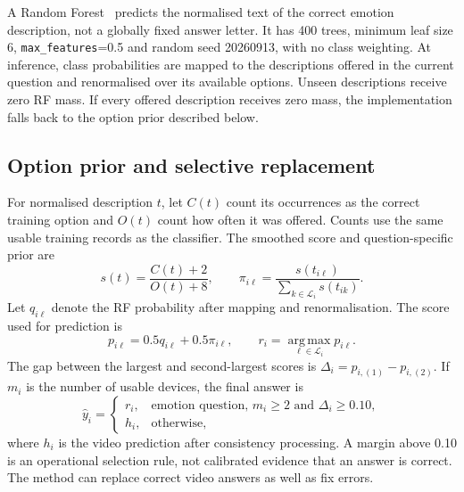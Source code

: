 \documentclass[12pt,a4paper]{article}
\begin{document}
A Random Forest~\cite{breiman} predicts the normalised text of the correct emotion description, not a globally fixed answer letter. It has 400 trees, minimum leaf size 6, \texttt{max\_features}=0.5 and random seed 20260913, with no class weighting. At inference, class probabilities are mapped to the descriptions offered in the current question and renormalised over its available options. Unseen descriptions receive zero RF mass. If every offered description receives zero mass, the implementation falls back to the option prior described below.

\subsection{Option prior and selective replacement}
For normalised description $t$, let $C(t)$ count its occurrences as the correct training option and $O(t)$ count how often it was offered. Counts use the same usable training records as the classifier. The smoothed score and question-specific prior are
\begin{equation}
 s(t)=\frac{C(t)+2}{O(t)+8},\qquad
 \pi_{i\ell}=\frac{s(t_{i\ell})}{\sum_{k\in\mathcal{L}_i}s(t_{ik})}.
\end{equation}
Let $q_{i\ell}$ denote the RF probability after mapping and renormalisation. The score used for prediction is
\begin{equation}
 p_{i\ell}=0.5q_{i\ell}+0.5\pi_{i\ell},\qquad
 r_i=\operatorname*{arg\,max}_{\ell\in\mathcal{L}_i}p_{i\ell}.
\end{equation}
The gap between the largest and second-largest scores is $\Delta_i=p_{i,(1)}-p_{i,(2)}$. If $m_i$ is the number of usable devices, the final answer is
\begin{equation}
 \hat y_i=\begin{cases}
 r_i,&\text{emotion question, }m_i\geq2\text{ and }\Delta_i\geq0.10,\\
 h_i,&\text{otherwise},
 \end{cases}
\end{equation}
where $h_i$ is the video prediction after consistency processing. A margin above 0.10 is an operational selection rule, not calibrated evidence that an answer is correct. The method can replace correct video answers as well as fix errors.
\end{document}
